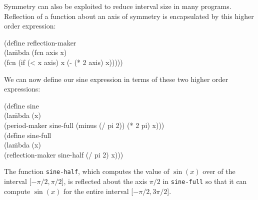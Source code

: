 	Symmetry can also be exploited to reduce interval size in many
programs.  Reflection of a function about an axis of symmetry is
encapsulated by this higher order expression:
\begin{tt}\begin{tabbing}
(de\=fine reflection-maker\\
\>	(la\=mbda (fcn axis x)\\
\>\>  (fcn (if (< x axis) x (- (* 2 axis) x)))))
\end{tabbing}\end{tt}


	We can now define our sine expression in terms of these two higher
order expressions:
\begin{tt}\begin{tabbing}
(de\=fine sine\\
\>	(la\=mbda (x)\\
\>\>		(period-maker sine-full (minus (/ pi 2))  (* 2 pi) x)))\\[.10in]
\kill
(de\=fine sine-full\\
\>	(la\=mbda (x)\\
\>\>		(reflection-maker sine-half (/ pi 2) x)))
\end{tabbing}\end{tt}
The function {\tt sine-half}, which computes the value of $\sin(x)$ over
of the interval [$-\pi/2, \pi/2$], is reflected about the axis $\pi/2$
in {\tt sine-full}
so that it can compute $\sin(x)$ for the entire interval [$-\pi/2,
3\pi/2$].

